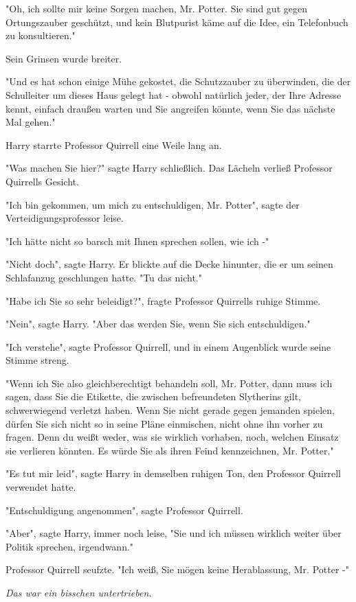 {"Oh, ich sollte mir keine Sorgen machen, Mr. Potter. Sie sind gut gegen Ortungszauber geschützt, und kein Blutpurist käme auf die Idee, ein Telefonbuch zu konsultieren."

Sein Grinsen wurde breiter.

"Und es hat schon einige Mühe gekostet, die Schutzzauber zu überwinden, die der Schulleiter um dieses Haus gelegt hat - obwohl natürlich jeder, der Ihre Adresse kennt, einfach draußen warten und Sie angreifen könnte, wenn Sie das nächste Mal gehen."

Harry starrte Professor Quirrell eine Weile lang an.

"Was machen Sie hier?" sagte Harry schließlich. Das Lächeln verließ Professor Quirrells Gesicht.

"Ich bin gekommen, um mich zu entschuldigen, Mr. Potter", sagte der Verteidigungsprofessor leise.

"Ich hätte nicht so barsch mit Ihnen sprechen sollen, wie ich -"

"Nicht doch", sagte Harry. Er blickte auf die Decke hinunter, die er um seinen Schlafanzug geschlungen hatte. "Tu das nicht."

"Habe ich Sie so sehr beleidigt?", fragte Professor Quirrells ruhige Stimme.

"Nein", sagte Harry. "Aber das werden Sie, wenn Sie sich entschuldigen."

"Ich verstehe", sagte Professor Quirrell, und in einem Augenblick wurde seine Stimme streng.

"Wenn ich Sie also gleichberechtigt behandeln soll, Mr. Potter, dann muss ich sagen, dass Sie die Etikette, die zwischen befreundeten Slytherins gilt, schwerwiegend verletzt haben. Wenn Sie nicht gerade gegen jemanden spielen, dürfen Sie sich nicht so in seine Pläne einmischen, nicht ohne ihn vorher zu fragen. Denn du weißt weder, was sie wirklich vorhaben, noch, welchen Einsatz sie verlieren könnten. Es würde Sie als ihren Feind kennzeichnen, Mr. Potter."

"Es tut mir leid", sagte Harry in demselben ruhigen Ton, den Professor Quirrell verwendet hatte.

"Entschuldigung angenommen", sagte Professor Quirrell.

"Aber", sagte Harry, immer noch leise, "Sie und ich müssen wirklich weiter über Politik sprechen, irgendwann."

Professor Quirrell seufzte. "Ich weiß, Sie mögen keine Herablassung, Mr. Potter -"

\emph{Das war ein bisschen untertrieben.}

}
